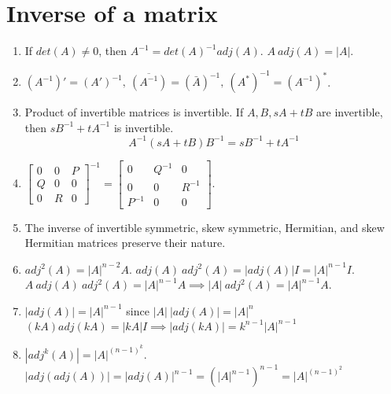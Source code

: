 \section{Inverse of a matrix}
\begin{enumerate}
	\item If $det(A) \ne 0$, then $A^{-1} = det(A)^{-1} adj(A)$.
		\subitem $A\ adj(A) = |A|$.
	\item $(A^{-1})' = (A')^{-1},\ \overline{(A^{-1})} = \left(\bar{A}\right)^{-1},\ (A^\ast)^{-1} = (A^{-1})^\ast$.
	\item Product of invertible matrices is invertible.
		\subitem If $A,B,sA+tB$ are invertible, then $sB^{-1}+tA^{-1}$ is invertible.
		$$ A^{-1}(sA+tB)B^{-1} = sB^{-1}+tA^{-1} $$
	\item $\begin{bmatrix} 0 & 0 & P \\ Q & 0 & 0 \\ 0 & R & 0 \end{bmatrix}^{-1} = \begin{bmatrix} 0 & Q^{-1} & 0 \\ 0 & 0 & R^{-1} \\ P^{-1} & 0 & 0 \end{bmatrix}$.
	\item The inverse of invertible symmetric, skew symmetric, Hermitian, and skew Hermitian matrices preserve their nature.
	\item $adj^2(A) = |A|^{n-2}A$.
		\subitem $adj(A)\ adj^2(A) = |adj(A)|I = |A|^{n-1}I$.
		\subitem $A\ adj(A)\ adj^2(A) = |A|^{n-1} A \implies |A|\ adj^2(A) = |A|^{n-1} A$.
	\item $|adj(A)| = |A|^{n-1}$ since $|A|\ |adj(A)| = |A|^n$
		\subitem $(kA) adj(kA) = |kA|I \implies |adj(kA)| = k^{n-1}|A|^{n-1}$
	\item $|adj^k(A)| = |A|^{(n-1)^k}$.
		\subitem $|adj(adj(A))| = |adj(A)|^{n-1} = (|A|^{n-1})^{n-1} = |A|^{(n-1)^2}$
\end{enumerate}

